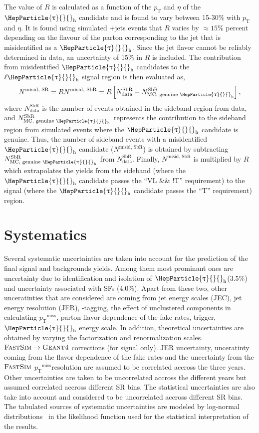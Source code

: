 \documentclass[11.5pt, a4paper]{article}
\newcommand{\pt}{\ensuremath{p_{\mathrm{T}}}\xspace}
\newcommand{\ptmiss}{\ensuremath{\pt^\text{miss}}}
\DeclareRobustCommand{\PW}{{\HepParticle{W}{}{}}\xspace}
\DeclareRobustCommand{\PQb}{{\HepParticle{b}{}{}}\xspace} %
\DeclareRobustCommand{\PQt}{\HepParticle{t}{}{}} %
\DeclareRobustCommand{\PAQt}{{\HepAntiParticle{\PQt}{}{}}\xspace} %
\DeclareRobustCommand{\PGt}{{\HepParticle{\uptau}{}{}}\xspace} %
\newcommand{\ttbar}{\PQt{}\PAQt} %
\newcommand{\tauh}{\ensuremath{\PGt_\mathrm{h}}\xspace}
\begin{document}
The value of $R$ is calculated as a function of the \pt and $\eta$ of the \tauh candidate and is found to vary between 15-30\% with \pt and $\eta$.
It is found using simulated {\PW}+jets events that $R$ varies by ${\approx}15\%$ percent depending on the flavour of the parton corresponding to the jet that is misidentified as a \tauh. Since the jet flavor cannot be reliably determined in data, an uncertainty of 15\% in $R$ is included.
The contribution from misidentified \tauh candidates to the $\ell\tauh$ signal region is then evaluated as,
	\begin{equation}
	N^{\text{misid, SR}} = R N^{\text{misid, SbR}} = R \left[N_{\text{data}}^{\text{SbR}} - N_{\text{MC, genuine \tauh}}^{\text{SbR}}\right],
	\end{equation}
where $N_{\text{data}}^{\text{SbR}}$ is the number of events obtained in the sideband region from data, and $N_{\text{MC, genuine \tauh}}^{\text{SbR}}$ represents the contribution to the sideband region from simulated events where the $\tauh$ candidate is genuine.
Thus, the number of sideband events with a misidentified \tauh candidate ($N^{\text{misid, SbR}}$) is obtained by subtracting $N_{\text{MC, genuine \tauh}}^{\text{SbR}}$ from $N_{\text{data}}^{\text{SbR}}$.
Finally, $N^{\text{misid, SbR}}$ is multiplied by $R$ which extrapolates the yields from the sideband (where the \tauh candidate passes the ``VL \&\& !T'' requirement) to the signal (where the \tauh candidate passes the ``T'' requirement) region.

\section{Systematics}
Several systematic uncertainties are taken into account for the prediction of the final signal and backgrounds yields. Among them most prominant ones are uncertainty due to identification and isolation of \tauh (3.5\%) and uncertainty associated with \ttbar SFs (4.0\%). Apart from these two, other unceratinties that are considered are coming from jet energy scales (JEC), jet energy resolution (JER), \PQb-tagging, the effect of unclustered components in calculating \ptmiss, parton flavor dependence of the fake rates, trigger, \tauh energy scale. In addition, theoretical uncertainties are obtained by varying the factorization and renormalization scales.
$\textsc{FastSim}\to\textsc{Geant4}$ corrections (for signal only). JER uncertainty, unceratinty coming from the flavor dependence of the fake rates and the uncertainty from the $\textsc{FastSim}$ \ptmiss resolution are assumed to be correlated accross the three years. Other uncertainties are taken to be uncorrelated accross the different years but assumed correlated accross different SR bins. The statistical uncertainties are also take into account and considered to be uncorrelated accross different SR bins. The tabulated sources of systematic uncertainties are modeled by log-normal distributions~\cite{CMS-NOTE-2011-005} in the likelihood function used for the statistical interpretation of the results. 
\end{document}
